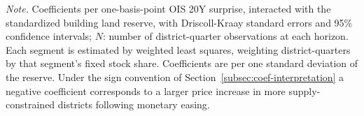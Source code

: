 \documentclass[a4paper,12pt, headsepline]{scrartcl}
\newcommand{\figcap}[2]{\caption[#1]{\textbf{#1}\newline #2}}
\numberwithin{equation}{section}
\begin{document}
\begin{table}[H]
	\centering
	\figcap{Stock-weighted property-specific specification (AS1b), coefficients}{Estimated interaction coefficient for the house and apartment outcomes per horizon $h$.}\label{tab:raw-property}
	

	\vspace{0.2cm}
	\begin{minipage}{0.9\textwidth}
		\footnotesize
		\textit{Note.} Coefficients per one-basis-point OIS 20Y surprise, interacted with the standardized building land reserve, with Driscoll-Kraay standard errors and 95\% confidence intervals; $N$: number of district-quarter observations at each horizon. Each segment is estimated by weighted least squares, weighting district-quarters by that segment's fixed stock share. Coefficients are per one standard deviation of the reserve. Under the sign convention of Section~\ref{subsec:coef-interpretation} a negative coefficient corresponds to a larger price increase in more supply-constrained districts following monetary easing.
	\end{minipage}
\end{table}

%
\end{document}
